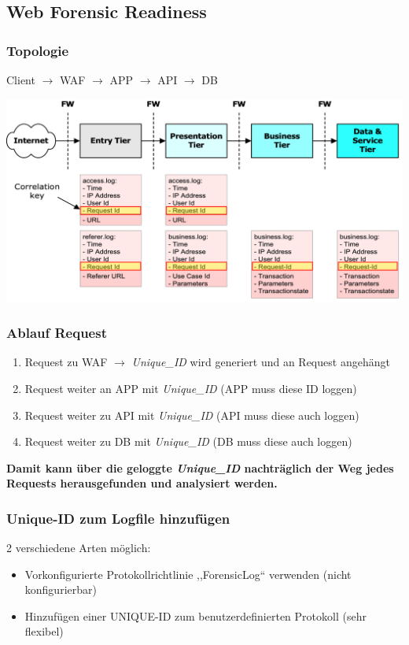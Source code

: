 \subsection{Web Forensic Readiness}

\subsubsection{Topologie}
Client $\rightarrow$ WAF $\rightarrow$ APP $\rightarrow$ API $\rightarrow$ DB
\begin{center}
    \includegraphics[width=1.0\linewidth]{./img/08-forensic_readiness/web_fr}
    \vspace{-8pt}
\end{center}

\subsubsection{Ablauf Request}
\begin{enumerate}
    \item Request zu WAF $\rightarrow$ \textit{Unique\_ID} wird generiert und an Request \glqq angehängt\grqq
    \item Request weiter an APP mit \textit{Unique\_ID} (APP muss diese ID loggen)
    \item Request weiter zu API mit \textit{Unique\_ID} (API muss diese auch loggen)
    \item Request weiter zu DB mit \textit{Unique\_ID} (DB muss diese auch loggen)\\
\end{enumerate}
\vspace{-8pt}
\textbf{Damit kann über die geloggte \textit{Unique\_ID} nachträglich der Weg jedes Requests herausgefunden und analysiert werden.}

\subsubsection{Unique-ID zum Logfile hinzufügen}
2 verschiedene Arten möglich:
\begin{itemize}
    \item Vorkonfigurierte Protokollrichtlinie ,,ForensicLog`` verwenden (nicht konfigurierbar)
    \item Hinzufügen einer UNIQUE-ID zum benutzerdefinierten Protokoll (sehr flexibel)
\end{itemize}

